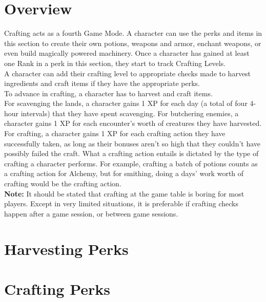 \chapter{Overview}\label{ch:craftingOverview}
Crafting acts as a fourth Game Mode.
A character can use the perks and items in this section to create their own potions, weapons and armor, enchant weapons, or even build magically powered machinery.
Once a character has gained at least one Rank in a perk in this section, they start to track Crafting Levels.\\
A character can add their crafting level to appropriate checks made to harvest ingredients and craft items if they have the appropriate perks.\\
To advance in crafting, a character has to harvest and craft items.\\
For scavenging the lands, a character gains 1 XP for each day (a total of four 4-hour intervals) that they have spent scavenging.
For butchering enemies, a character gains 1 XP for each encounter's worth of creatures they have harvested.\\
For crafting, a character gains 1 XP for each crafting action they have successfully taken, as long as their bonuses aren't so high that they couldn't have possibly failed the craft.
What a crafting action entails is dictated by the type of crafting a character performs.
For example, crafting a batch of potions counts as a crafting action for Alchemy, but for smithing, doing a days' work worth of crafting would be the crafting action.\\
\textbf{Note:} It should be stated that crafting at the game table is boring for most players.
Except in very limited situations, it is preferable if crafting checks happen after a game session, or between game sessions.

\chapter{Harvesting Perks}\label{ch:harvestingPerks}









\chapter{Crafting Perks}\label{ch:craftingPerks}


